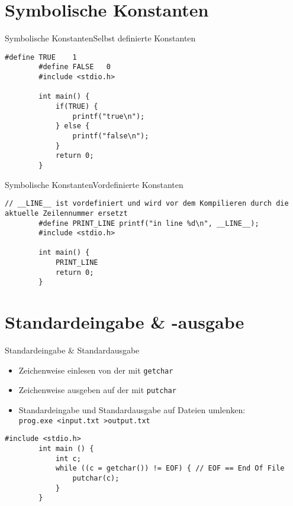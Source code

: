 \documentclass[10pt]{beamer} %
\begin{document}
\section{Symbolische Konstanten}

\begin{frame}[fragile]{Symbolische Konstanten}{Selbst definierte Konstanten}

	\begin{lstlisting}[gobble=4]
		#define TRUE    1
		#define FALSE   0
		#include <stdio.h>
		
		int main() {
			if(TRUE) {
				printf("true\n");
			} else {
				printf("false\n");
			}
			return 0;
		}
	\end{lstlisting}

\end{frame}

\begin{frame}[fragile]{Symbolische Konstanten}{Vordefinierte Konstanten}
	
	\begin{lstlisting}[gobble=4]
		// __LINE__ ist vordefiniert und wird vor dem Kompilieren durch die aktuelle Zeilennummer ersetzt
		#define PRINT_LINE printf("in line %d\n", __LINE__);
		#include <stdio.h>
		
		int main() {
			PRINT_LINE
			return 0;
		}
	\end{lstlisting}

\end{frame}

\section{Standardeingabe \& -ausgabe}

\begin{frame}[fragile]{Standardeingabe \& Standardausgabe}

	\begin{itemize}
		\item Zeichenweise einlesen von der  mit \texttt{getchar}
		\item Zeichenweise ausgeben auf der  mit \texttt{putchar}
		\item Standardeingabe und Standardausgabe auf Dateien umlenken:\\
				\texttt{prog.exe <input.txt >output.txt}
	\end{itemize}

	\hspace{1ex}

	\begin{lstlisting}[gobble=4]
		#include <stdio.h>
		int main () {
			int c;
			while ((c = getchar()) != EOF) { // EOF == End Of File
				putchar(c);
			}
		}
	\end{lstlisting}

\end{frame}
\end{document}
